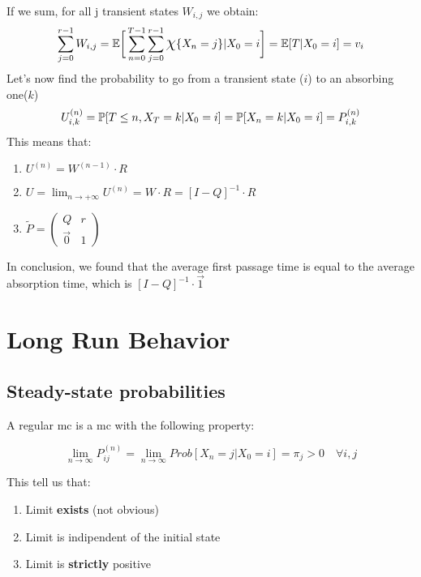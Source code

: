 If we sum, for all j transient states $W_{i,j}$  we obtain:
\begin{equation}
	\sum\limits_{j=0}^{r-1}W_{i,j} = \mathbb{E}\bigg[\sum\limits_{n=0}^{T-1}\sum\limits_{j=0}^{r-1}\mbox{\Large $\chi$}\{X_n=j\}|X_0=i\bigg] = \mathbb{E}[T|X_0=i]=v_i
\end{equation}
Let's now find the probability to go from a transient state ($i$) to an absorbing one($k$)
\begin{equation}
	U_{i,k}^{(n)} = \mathbb{P}[T \le n , X_T = k | X_0=i] = \mathbb{P}[X_n=k|X_0=i]=P_{i,k}^{(n)}
\end{equation}
This means that:
\begin{enumerate}
	\item $U^{(n)} = W^{(n-1)}\cdot R$
	\item $U=\lim_{n\to +\infty} U^{(n)} = W \cdot R = [I-Q]^{-1}\cdot R$
	\item $\tilde{P}=\begin{pmatrix} Q & r \\ \vec{0}&1 \end{pmatrix}$
\end{enumerate}
In conclusion, we found that the average first passage time is equal to the average
 absorption time, which is $[I-Q]^{-1}\cdot \vec{1}$

\chapter{Long Run Behavior}
\section{Steady-state probabilities}

	\begin{definition}
		A regular \gls{mc} is a \gls{mc} with the following property:

		\begin{equation} \lim_{n \to \infty} P_{ij}^{(n)} = \lim_{ n \to \infty} Prob[ X_n=j | X_0 =i] = \pi_j > 0 \quad \forall i, j \end{equation}

	\end{definition}

	This tell us that:
	\begin{enumerate}
		\item Limit \textbf{exists} (not obvious)
		\item Limit is indipendent of the initial state
		\item Limit is \textbf{strictly} positive
	\end{enumerate}

